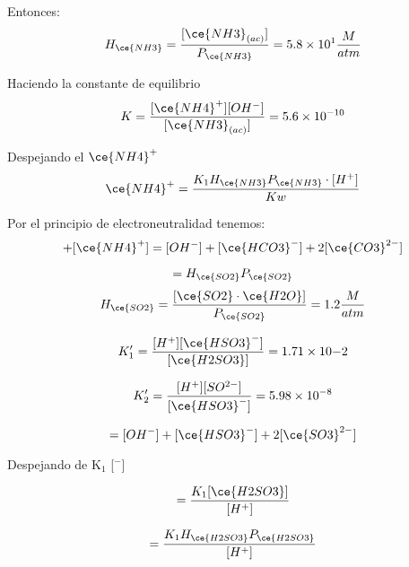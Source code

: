 Entonces:
\begin{equation*}
H_{\ce{NH3}} =\frac{ [\ce{NH3}_{(ac)}]} { P_{\ce{NH3}}} = 5.8\times10^1\frac{M}{atm}
\end{equation*}

Haciendo la constante de equilibrio
\begin{equation*}
K =\frac {[\ce{NH4}^+][OH^-]} {[\ce{NH3}_{(ac)}]} = 5.6\times10^{-10}
\end{equation*}

Despejando el $\ce{NH4}^+$
\begin{equation*}
\ce{NH4}^+ = \frac{K_1H_{\ce{NH3}}P_{\ce{NH3}}\cdot [H^+]} { Kw} 
\end{equation*}

Por el principio de electroneutralidad tenemos:
\begin{equation*}
[H^+] + [\ce{NH4}^+] = [OH^-] + [\ce{HCO3}^-] +2[\ce{CO3}^{2-}]
\end{equation*}



\begin{equation*}
[\ce{SO2}\cdot\ce{H2O}] = H_{\ce{SO2}} P_{\ce{SO2}}
\end{equation*} 
\begin{equation*}
H_{\ce{SO2}} =\frac{ [\ce{SO2}\cdot\ce{H2O}]} { P_{\ce{SO2}}} = 1.2\frac{M}{atm}
\end{equation*}

\begin{equation*}
K'_1 = \frac{[H^+][\ce{HSO3}^-]} {[\ce{H2SO3}]} = 1.71\times10{-2}
\end{equation*}

\begin{equation*}
K'_2 = \frac{[H^+] [SO^{2-}]}{[\ce{HSO3}^-]} = 5.98\times10^{-8}
\end{equation*}

\begin{equation*}
[H^+] = [OH^-] + [\ce{HSO3}^-] +2[\ce{SO3}^{2-}]
\end{equation*}

Despejando de K$_1$ [$^-$]

\begin{equation*}
[\ce{HSO3}^{-}] =\frac{ K_1[\ce{H2SO3}]} {[H^+]} 
\end{equation*}

\begin{equation*}
[\ce{HSO3}^-]= \frac{K_1 H_{\ce{H2SO3}}P_{\ce{H2SO3}}} {[H^+]}
\end{equation*}

